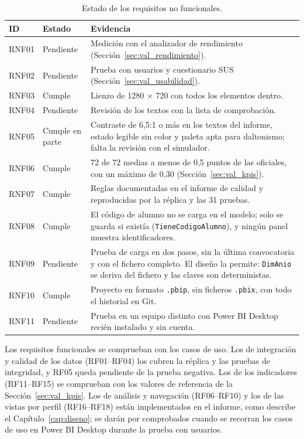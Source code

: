 \documentclass[12pt, a4paper, oneside]{report}
\begin{document}
\begin{table}[H]
\centering
\small
{}\renewcommand{\arraystretch}{1.1}
\begin{tabularx}{\textwidth}{@{} p{1.3cm} >{\raggedright\arraybackslash}p{2.2cm} X @{}}
\toprule
\textbf{ID} & \textbf{Estado} & \textbf{Evidencia} \\ \midrule
RNF01 & Pendiente & Medición con el analizador de rendimiento (Sección~\ref{sec:val_rendimiento}). \\ \addlinespace
RNF02 & Pendiente & Prueba con usuarios y cuestionario SUS (Sección~\ref{sec:val_usabilidad}). \\ \addlinespace
RNF03 & Cumple & Lienzo de 1280 $\times$ 720 con todos los elementos dentro. \\ \addlinespace
RNF04 & Pendiente & Revisión de los textos con la lista de comprobación. \\ \addlinespace
RNF05 & Cumple en parte & Contraste de 6,5:1 o más en los textos del informe, estado legible sin color y paleta apta para daltonismo; falta la revisión con el simulador. \\ \addlinespace
RNF06 & Cumple & 72 de 72 medias a menos de 0,5 puntos de las oficiales, con un máximo de 0,30 (Sección~\ref{sec:val_kpis}). \\ \addlinespace
RNF07 & Cumple & Reglas documentadas en el informe de calidad y reproducidas por la réplica y las 31 pruebas. \\ \addlinespace
RNF08 & Cumple & El código de alumno no se carga en el modelo; solo se guarda si existía (\texttt{TieneCodigoAlumno}), y ningún panel muestra identificadores. \\ \addlinespace
RNF09 & Pendiente & Prueba de carga en dos pasos, sin la última convocatoria y con el fichero completo. El diseño la permite: \texttt{DimAnio} se deriva del fichero y las claves son deterministas. \\ \addlinespace
RNF10 & Cumple & Proyecto en formato \texttt{.pbip}, sin ficheros \texttt{.pbix}, con todo el historial en Git. \\ \addlinespace
RNF11 & Pendiente & Prueba en un equipo distinto con Power BI Desktop recién instalado y sin cuenta. \\ \bottomrule
\end{tabularx}
\caption{Estado de los requisitos no funcionales.}
\label{tab:cumplimiento_rnf}
\end{table}

Los requisitos funcionales se comprueban con los casos de uso. Los de integración y calidad de los datos (RF01--RF04) los cubren la réplica y las pruebas de integridad, y RF05 queda pendiente de la prueba negativa. Los de los indicadores (RF11--RF15) se comprueban con los valores de referencia de la Sección~\ref{sec:val_kpis}. Los de análisis y navegación (RF06--RF10) y los de las vistas por perfil (RF16--RF18) están implementados en el informe, como describe el Capítulo~\ref{cap:diseno}; se darán por comprobados cuando se recorran los casos de uso en Power BI Desktop durante la prueba con usuarios.
\end{document}
